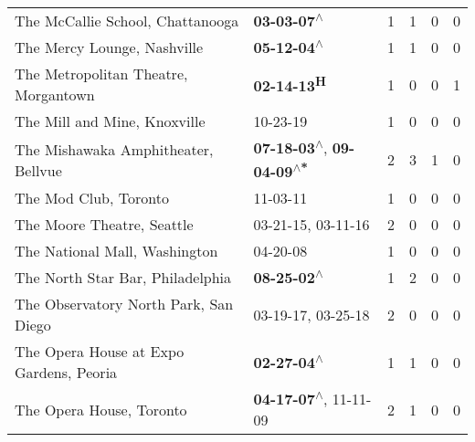 \begin{supertabular}{p{0.4\textwidth}p{0.3\textwidth}p{0.05\textwidth}p{0.05\textwidth}p{0.05\textwidth}p{0.05\textwidth}}
                                             The McCallie School, Chattanooga &                                                 \textbf{03-03-07\textsuperscript{$\wedge$}} &  1 &  1 &  0 &  0 \\
                                                  The Mercy Lounge, Nashville &                                                 \textbf{05-12-04\textsuperscript{$\wedge$}} &  1 &  1 &  0 &  0 \\
                                         The Metropolitan Theatre, Morgantown &                                                        \textbf{02-14-13\textsuperscript{H}} &  1 &  0 &  0 &  1 \\
                                                 The Mill and Mine, Knoxville &                                                                  10-23-19\textsuperscript{} &  1 &  0 &  0 &  0 \\
                                          The Mishawaka Amphitheater, Bellvue &   \textbf{07-18-03\textsuperscript{$\wedge$}}, \textbf{09-04-09\textsuperscript{$\wedge$*}} &  2 &  3 &  1 &  0 \\
                                                        The Mod Club, Toronto &                                                                  11-03-11\textsuperscript{} &  1 &  0 &  0 &  0 \\
                                                   The Moore Theatre, Seattle &                                      03-21-15\textsuperscript{}, 03-11-16\textsuperscript{} &  2 &  0 &  0 &  0 \\
                                                The National Mall, Washington &                                                                  04-20-08\textsuperscript{} &  1 &  0 &  0 &  0 \\
                                             The North Star Bar, Philadelphia &                                                 \textbf{08-25-02\textsuperscript{$\wedge$}} &  1 &  2 &  0 &  0 \\
                                        The Observatory North Park, San Diego &                                      03-19-17\textsuperscript{}, 03-25-18\textsuperscript{} &  2 &  0 &  0 &  0 \\
                                      The Opera House at Expo Gardens, Peoria &                                                 \textbf{02-27-04\textsuperscript{$\wedge$}} &  1 &  1 &  0 &  0 \\
                                                     The Opera House, Toronto &                     \textbf{04-17-07\textsuperscript{$\wedge$}}, 11-11-09\textsuperscript{} &  2 &  1 &  0 &  0 \\

\end{supertabular}
